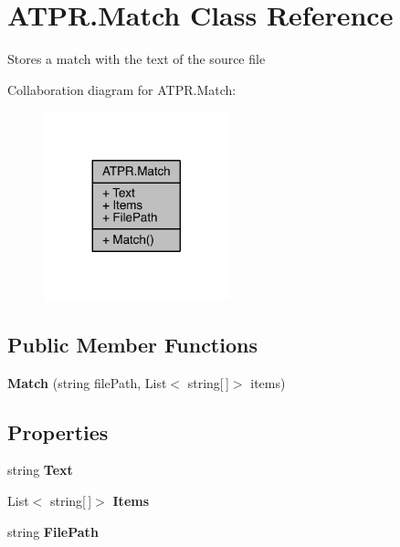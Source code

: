 \hypertarget{class_a_t_p_r_1_1_match}{}\section{A\+T\+P\+R.\+Match Class Reference}
\label{class_a_t_p_r_1_1_match}


Stores a match with the text of the source file  




Collaboration diagram for A\+T\+P\+R.\+Match\+:
\nopagebreak
\begin{figure}[H]
\begin{center}
\leavevmode
\includegraphics[width=152pt]{d4/d82/class_a_t_p_r_1_1_match__coll__graph}
\end{center}
\end{figure}
\subsection*{Public Member Functions}
\begin{DoxyCompactItemize}
\item 
\hypertarget{class_a_t_p_r_1_1_match_a306eee0d1885fb716091fcd7ce99515d}{}\label{class_a_t_p_r_1_1_match_a306eee0d1885fb716091fcd7ce99515d} 
{\bfseries Match} (string file\+Path, List$<$ string\mbox{[}$\,$\mbox{]}$>$ items)
\end{DoxyCompactItemize}
\subsection*{Properties}
\begin{DoxyCompactItemize}
\item 
\hypertarget{class_a_t_p_r_1_1_match_a2b0e5fd5ce30a4c94427f1625fc18277}{}\label{class_a_t_p_r_1_1_match_a2b0e5fd5ce30a4c94427f1625fc18277} 
string {\bfseries Text}
\item 
\hypertarget{class_a_t_p_r_1_1_match_ab2c45325967b080e1d391bcdb14b8759}{}\label{class_a_t_p_r_1_1_match_ab2c45325967b080e1d391bcdb14b8759} 
List$<$ string\mbox{[}$\,$\mbox{]}$>$ {\bfseries Items}
\item 
\hypertarget{class_a_t_p_r_1_1_match_a22f9ef303775cd648e278fe57a098f22}{}\label{class_a_t_p_r_1_1_match_a22f9ef303775cd648e278fe57a098f22} 
string {\bfseries File\+Path}
\end{DoxyCompactItemize}


